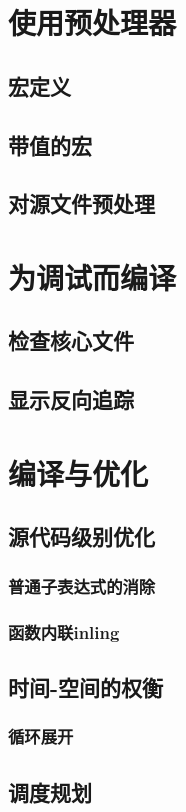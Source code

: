 \documentclass[lang=cn,12pt,newtx,scheme=chinese]{elegantbook}
\begin{document}
\chapter{使用预处理器}
\section{宏定义}
\section{带值的宏}
\section{对源文件预处理}

\chapter{为调试而编译}
\section{检查核心文件}
\section{显示反向追踪}

\chapter{编译与优化}
\section{源代码级别优化}
\subsection{普通子表达式的消除}
\subsection{函数内联inling}
\section{时间-空间的权衡}
\subsection{循环展开}
\section{调度规划}
\end{document}
